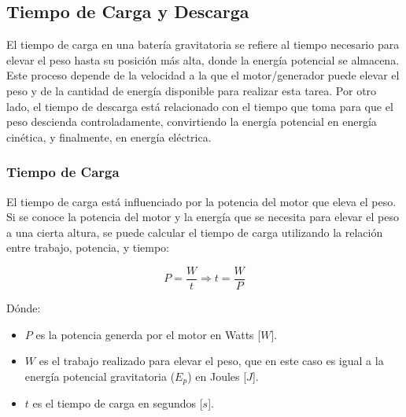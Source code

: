         \subsection{Tiempo de Carga y Descarga}
            El tiempo de carga en una batería gravitatoria se refiere al tiempo necesario para elevar el peso hasta su posición más alta, donde la energía potencial se almacena. Este proceso depende de la velocidad a la que el motor/generador puede elevar el peso y de la cantidad de energía disponible para realizar esta tarea. Por otro lado, el tiempo de descarga está relacionado con el tiempo que toma para que el peso descienda controladamente, convirtiendo la energía potencial en energía cinética, y finalmente, en energía eléctrica.\par

            \subsubsection{Tiempo de Carga}
                El tiempo de carga está influenciado por la potencia del motor que eleva el peso. Si se conoce la potencia del motor y la energía que se necesita para elevar el peso a una cierta altura, se puede calcular el tiempo de carga utilizando la relación entre trabajo, potencia, y tiempo:\par

                \begin{equation}
                    P = \frac{W}{t} \Rightarrow t = \frac{W}{P}
                \end{equation}

                Dónde:\par
                
                \begin{itemize} [label=•]
                    \setlength{\itemindent}{1.5em}
                    
                    \item $P$ es la potencia generda por el motor en Watts [$W$].
                    \item $W$ es el trabajo realizado para elevar el peso, que en este caso es igual a la energía potencial gravitatoria ($E_p$) en Joules [$J$].
                    \item $t$ es el tiempo de carga en segundos [$s$].
                \end{itemize}


